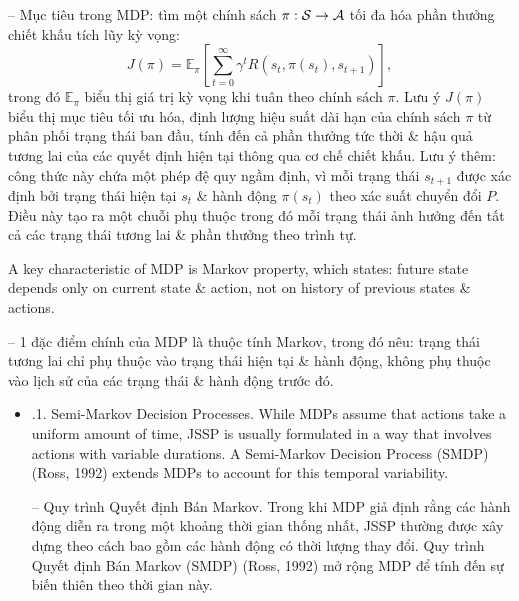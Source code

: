 \documentclass{article}
\begin{document}
\begin{itemize}
\begin{itemize}
        -- Mục tiêu trong MDP: tìm một chính sách $\pi:{\cal S}\to{\cal A}$ tối đa hóa phần thưởng chiết khấu tích lũy kỳ vọng:
        \begin{equation*}
            J(\pi) = \mathbb{E}_\pi\left[\sum_{t=0}^\infty \gamma^tR(s_t,\pi(s_t),s_{t+1})\right],
        \end{equation*}
        trong đó $\mathbb{E}_\pi$ biểu thị giá trị kỳ vọng khi tuân theo chính sách $\pi$. Lưu ý $J(\pi)$ biểu thị mục tiêu tối ưu hóa, định lượng hiệu suất dài hạn của chính sách $\pi$ từ phân phối trạng thái ban đầu, tính đến cả phần thưởng tức thời \& hậu quả tương lai của các quyết định hiện tại thông qua cơ chế chiết khấu. Lưu ý thêm: công thức này chứa một phép đệ quy ngầm định, vì mỗi trạng thái $s_{t+1}$ được xác định bởi trạng thái hiện tại $s_t$ \& hành động $\pi(s_t)$ theo xác suất chuyển đổi $P$. Điều này tạo ra một chuỗi phụ thuộc trong đó mỗi trạng thái ảnh hưởng đến tất cả các trạng thái tương lai \& phần thưởng theo trình tự.

        A key characteristic of MDP is Markov property, which states: future state depends only on current state \& action, not on history of previous states \& actions.

        -- 1 đặc điểm chính của MDP là thuộc tính Markov, trong đó nêu: trạng thái tương lai chỉ phụ thuộc vào trạng thái hiện tại \& hành động, không phụ thuộc vào lịch sử của các trạng thái \& hành động trước đó.
        \begin{itemize}
            \item {.1. Semi-Markov Decision Processes.} While MDPs assume that actions take a uniform amount of time, JSSP is usually formulated in a way that involves actions with variable durations. A Semi-Markov Decision Process (SMDP) (Ross, 1992) extends MDPs to account for this temporal variability.

            -- {\sf Quy trình Quyết định Bán Markov.} Trong khi MDP giả định rằng các hành động diễn ra trong một khoảng thời gian thống nhất, JSSP thường được xây dựng theo cách bao gồm các hành động có thời lượng thay đổi. Quy trình Quyết định Bán Markov (SMDP) (Ross, 1992) mở rộng MDP để tính đến sự biến thiên theo thời gian này.


\end{itemize}
\end{itemize}
\end{itemize}
\end{document}
